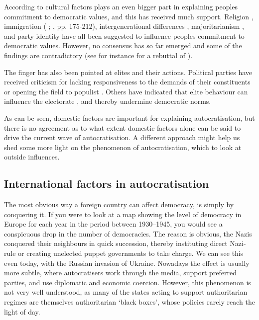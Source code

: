According to \citet{margalit_economic_2019} cultural factors plays an even bigger part in explaining peoples commitment to democratic values, and this has received much support. Religion \citep[pp.72-85]{huntington_third_1991}, immigration (\citeauthor{dinas_waking_2019} \citeyear{dinas_waking_2019}; \citeauthor{norris_cultural_2019} \citeyear{norris_cultural_2019}, pp. 175-212), intergenerational differences \citep{foa_youth_2020, foa_danger_2016, norris_cultural_2019, wuttke_have_2022}, majoritarianism \citep{grossman_majoritarian_2022, wunsch_demand_2023}, and party identity \citep{abramowitz_united_2019, bisgaard_how_2019, graham_democracy_2020, iyengar_strengthening_2018, krishnarajan_rationalizing_2023, peterson_partisan_2021, singer_fiddling_2023} have all been suggested to influence peoples commitment to democratic values. However, no consensus has so far emerged and some of the findings are contradictory (see for instance \citeauthor{schafer_cultural_2022} \citeyear{schafer_cultural_2022} for a rebuttal of \citeauthor{norris_cultural_2019} \citeyear{norris_cultural_2019}). 

The finger has also been pointed at elites and their actions. Political parties have received criticism for lacking responsiveness to the demands of their constituents or opening the field to populist \citep{berman_causes_2021, grzymala-busse_failure_2019}. Others have indicated that elite behaviour can influence the electorate \citep{broockman_causal_2017, clayton_elite_2021}, and thereby undermine democratic norms.

As can be seen, domestic factors are important for explaining autocratisation, but there is no agreement as to what extent domestic factors alone can be said to drive the current wave of autocratisation. A different approach might help us shed some more light on the phenomenon of autocratisation, which to look at outside influences.

\subsection{International factors in autocratisation}
The most obvious way a foreign country can affect democracy, is simply by conquering it. If you were to look at a map showing the level of democracy in Europe for each year in the period between 1930--1945, you would see a conspicuous drop in the number of democracies. The reason is obvious, the Nazis conquered their neighbours in quick succession, thereby instituting direct Nazi-rule or creating unelected puppet governments to take charge. We can see this even today, with the Russian invasion of Ukraine. Nowadays the effect is usually more subtle, where autocratisers work through the media, support preferred parties, and use diplomatic and economic coercion. However, this phenomenon is not very well understood, as many of the states acting to support authoritarian regimes are themselves authoritarian `black boxes', whose policies rarely reach the light of day.  

